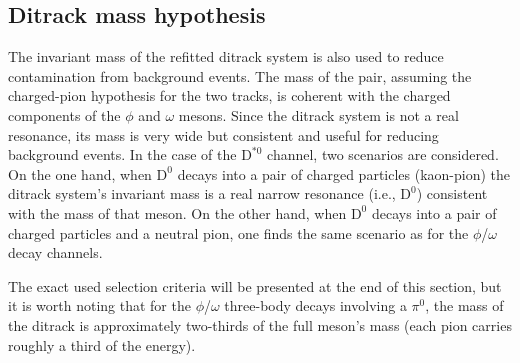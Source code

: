 \subsection{Ditrack mass hypothesis}
The invariant mass of the refitted ditrack system is also used to reduce contamination from background events. The mass of the pair, assuming the charged-pion hypothesis for the two tracks, is coherent with the charged components of the $\phi$ and $\omega$ mesons. Since the ditrack system is not a real resonance, its mass is very wide but consistent and useful for reducing background events. In the case of the $\text{D}^{*0}$ channel, two scenarios are considered. On the one hand, when $\text{D}^{0}$ decays into a pair of charged particles (kaon-pion) the ditrack system's invariant mass is a real narrow resonance (i.e., $\text{D}^{0}$) consistent with the mass of that meson. On the other hand, when $\text{D}^{0}$ decays into a pair of charged particles and a neutral pion, one finds the same scenario as for the $\phi$/$\omega$ decay channels.

The exact used selection criteria will be presented at the end of this section, but it is worth noting that for the $\phi$/$\omega$ three-body decays involving a $\pi^0$, the mass of the ditrack is approximately two-thirds of the full meson's mass (each pion carries roughly a third of the energy).

